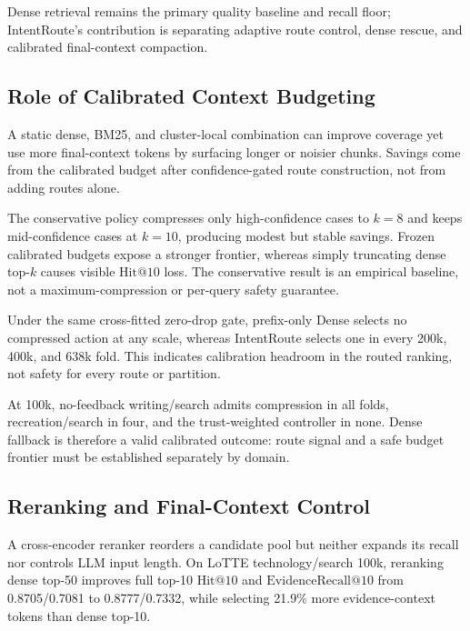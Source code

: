 Dense retrieval remains the primary quality baseline and recall floor; IntentRoute's contribution is separating adaptive route control, dense rescue, and calibrated final-context compaction.

\subsection{Role of Calibrated Context Budgeting}
\label{sec:07-discussion:role-of-calibrated-context-budgeting}

A static dense, BM25, and cluster-local combination can improve coverage yet use more final-context tokens by surfacing longer or noisier chunks. Savings come from the calibrated budget after confidence-gated route construction, not from adding routes alone.

The conservative policy compresses only high-confidence cases to $k=8$ and keeps mid-confidence cases at $k=10$, producing modest but stable savings. Frozen calibrated budgets expose a stronger frontier, whereas simply truncating dense top-$k$ causes visible $\mathrm{Hit@10}$ loss. The conservative result is an empirical baseline, not a maximum-compression or per-query safety guarantee.

Under the same cross-fitted zero-drop gate, prefix-only Dense selects no compressed action at any scale, whereas IntentRoute selects one in every 200k, 400k, and 638k fold. This indicates calibration headroom in the routed ranking, not safety for every route or partition.

At 100k, no-feedback writing/search admits compression in all folds, recreation/search in four, and the trust-weighted controller in none. Dense fallback is therefore a valid calibrated outcome: route signal and a safe budget frontier must be established separately by domain.

\subsection{Reranking and Final-Context Control}
\label{sec:07-discussion:reranking-and-final-context-control}

A cross-encoder reranker reorders a candidate pool but neither expands its recall nor controls LLM input length. On LoTTE technology/search 100k, reranking dense top-50 improves full top-10 $\mathrm{Hit@10}$ and $\mathrm{EvidenceRecall@10}$ from 0.8705/0.7081 to 0.8777/0.7332, while selecting 21.9\% more evidence-context tokens than dense top-10.

